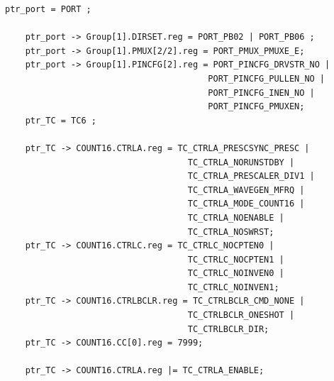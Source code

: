 \documentclass[a4paper]{article}
\begin{document}
\begin{lstlisting}[style=CStyle]
	ptr_port = PORT ;
	
	ptr_port -> Group[1].DIRSET.reg = PORT_PB02 | PORT_PB06 ; 
	ptr_port -> Group[1].PMUX[2/2].reg = PORT_PMUX_PMUXE_E;
	ptr_port -> Group[1].PINCFG[2].reg = PORT_PINCFG_DRVSTR_NO |
										PORT_PINCFG_PULLEN_NO |
										PORT_PINCFG_INEN_NO |
										PORT_PINCFG_PMUXEN;
	ptr_TC = TC6 ;
	
	ptr_TC -> COUNT16.CTRLA.reg = TC_CTRLA_PRESCSYNC_PRESC |
									TC_CTRLA_NORUNSTDBY |
									TC_CTRLA_PRESCALER_DIV1 |
									TC_CTRLA_WAVEGEN_MFRQ |
									TC_CTRLA_MODE_COUNT16 |
									TC_CTRLA_NOENABLE |
									TC_CTRLA_NOSWRST;
	ptr_TC -> COUNT16.CTRLC.reg = TC_CTRLC_NOCPTEN0 |
									TC_CTRLC_NOCPTEN1 |
									TC_CTRLC_NOINVEN0 |
									TC_CTRLC_NOINVEN1;
	ptr_TC -> COUNT16.CTRLBCLR.reg = TC_CTRLBCLR_CMD_NONE |
									TC_CTRLBCLR_ONESHOT |
									TC_CTRLBCLR_DIR;
	ptr_TC -> COUNT16.CC[0].reg = 7999;
	
	ptr_TC -> COUNT16.CTRLA.reg |= TC_CTRLA_ENABLE;	
	\end{lstlisting}
\end{document}
